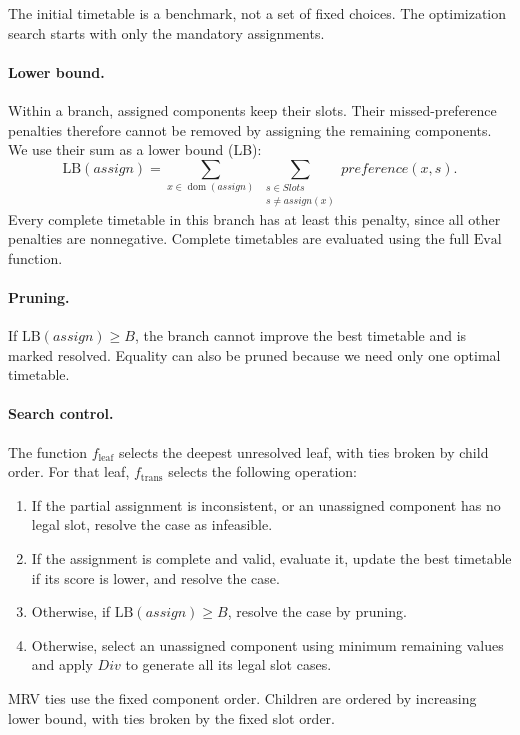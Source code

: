 The initial timetable is a benchmark, not a set of
fixed choices. The optimization search starts with
only the mandatory assignments.

\paragraph{Lower bound.}
Within a branch, assigned components keep their slots.
Their missed-preference penalties therefore cannot be removed
by assigning the remaining components. We use their sum as
a lower bound (LB):
\[
\mathrm{LB}(\mathit{assign})
=
\sum_{x\in\operatorname{dom}(\mathit{assign})}
\ \sum_{\substack{s\in\mathit{Slots}\\
s\neq\mathit{assign}(x)}}
\mathit{preference}(x,s).
\]
Every complete timetable in this branch has at least this
penalty, since all other penalties are nonnegative.
Complete timetables are evaluated using the full
$\mathrm{Eval}$ function.

\paragraph{Pruning.}
If $\mathrm{LB}(\mathit{assign}) \ge B$, the branch cannot
improve the best timetable and is marked resolved.
Equality can also be pruned because we need only one
optimal timetable.

\paragraph{Search control.}
The function $f_{\mathrm{leaf}}$ selects the deepest
unresolved leaf, with ties broken by child order.
For that leaf, $f_{\mathrm{trans}}$ selects the
following operation:
\begin{enumerate}
  \item If the partial assignment is inconsistent,
  or an unassigned component has no legal slot,
  resolve the case as infeasible.

  \item If the assignment is complete and valid,
  evaluate it, update the best timetable if its
  score is lower, and resolve the case.

  \item Otherwise, if
  $\mathrm{LB}(\mathit{assign})\ge B$,
  resolve the case by pruning.

  \item Otherwise, select an unassigned component
  using minimum remaining values and apply
  $\mathit{Div}$ to generate all its legal slot cases.
\end{enumerate}
MRV ties use the fixed component order. Children
are ordered by increasing lower bound, with ties
broken by the fixed slot order.

